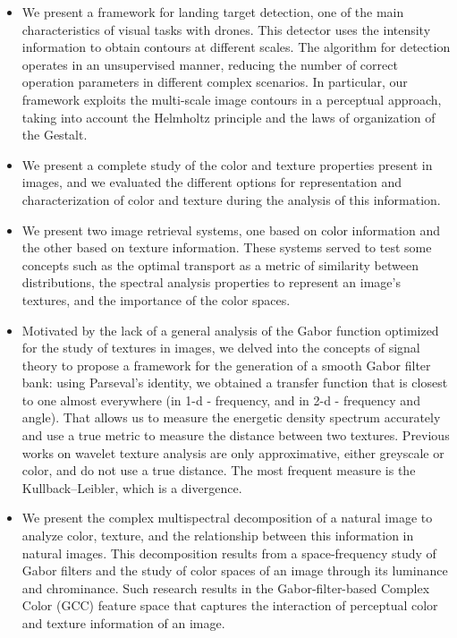 \begin{itemize}
	\item We present a framework for landing target detection, one of the main characteristics of visual tasks with drones. This detector uses the intensity information to obtain contours at different scales. The algorithm for detection operates in an unsupervised manner, reducing the number of correct operation parameters in different complex scenarios. In particular, our framework exploits the multi-scale image contours in a perceptual approach, taking into account the Helmholtz principle and the laws of organization of the Gestalt.
	
	\item We present a complete study of the color and texture properties present in images, and we evaluated the different options for representation and characterization of color and texture during the analysis of this information.
	
	\item We present two image retrieval systems, one based on color information and the other based on texture information. These systems served to test some concepts such as the optimal transport as a metric of similarity between distributions, the spectral analysis properties to represent an image's textures, and the importance of the color spaces.
	
	\item Motivated by the lack of a general analysis of the Gabor function optimized for the study of textures in images, we delved into the concepts of signal theory to propose a framework for the generation of a smooth Gabor filter bank: using Parseval's identity, we obtained a transfer function that is closest to one almost everywhere (in 1-d - frequency, and in 2-d - frequency and angle). That allows us to measure the energetic density spectrum accurately and use a true metric to measure the distance between two textures. Previous works on wavelet texture analysis are only approximative, either greyscale or color, and do not use a true distance. The most frequent measure is the Kullback–Leibler, which is a divergence.
	
	\item We present the complex multispectral decomposition of a natural image to analyze color, texture, and the relationship between this information in natural images. This decomposition results from a space-frequency study of Gabor filters and the study of color spaces of an image through its luminance and chrominance. Such research results in the Gabor-filter-based Complex Color (GCC) feature space that captures the interaction of perceptual color and texture information of an image.
	

\end{itemize}
